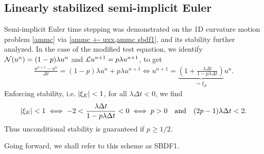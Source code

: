 \subsection{Linearly stabilized semi-implicit Euler}
Semi-implicit Euler time stepping was demonstrated on the 1D curvature motion problem \cref{ammc} via \cref{ammc +- uxx,ammc sbdf1}, and its stability further analyzed. In the case of the modified test equation, we identify $\mathcal{N}(u^n) = (1-p)\lambda u^n$ and $\mathcal{L} u^{n+1} = p\lambda u^{n+1}$, to get 
\begin{align}
\frac{u^{n+1} - u^n}{\Delta t} 
= (1-p)\lambda u^n + p\lambda u^{n+1} 
\iff 
u^{n+1} 
= \underbrace{\left(1 + \frac{\lambda \Delta t}{1 - p\lambda\Delta t} \right)}_{=\xi_E} u^n.
\end{align}
Enforcing stability, i.e. $\left|\xi_E\right| < 1$, for all $\lambda\Delta t < 0$, we find 
\begin{align}
\left|\xi_E\right| < 1 \iff 
-2 < \frac{\lambda\Delta t}{1 - p\lambda\Delta t} < 0
\iff p > 0 \quad\text{and}\quad (2p-1)\lambda\Delta t < 2.
\end{align}
Thus unconditional stability is guaranteed if $p \geq 1/2$.

Going forward, we shall refer to this scheme as SBDF1.

